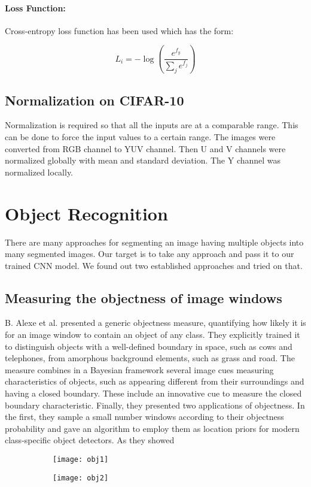  
 \paragraph{Loss Function:}
 Cross-entropy loss function has been used which has the form:
 
 
$$ L_{i} = -\log{(\frac{e^{f_y}}{\sum_j{e^{f_j}}})}$$

\subsection{Normalization on CIFAR-10}

Normalization is required so that all the inputs are at a comparable range. This can be done to force the input values to a certain range. The images were converted from RGB channel to YUV channel. Then U and V channels were normalized globally with mean and standard deviation. The Y channel was normalized locally.

\section{Object Recognition}
There are many approaches for segmenting an image having multiple objects into many segmented images. Our target is to take any approach and pass it to our trained CNN model. We found out two established approaches and tried on that.

\subsection{Measuring the objectness of image windows}
B. Alexe et al. \cite{15} presented a generic objectness measure, quantifying how likely it is for an image window to contain an object of any
class. They explicitly trained it to distinguish objects with a well-defined boundary in space, such as cows and telephones, from amorphous
background elements, such as grass and road. The measure combines in a Bayesian framework several image cues measuring
characteristics of objects, such as appearing different from their surroundings and having a closed boundary. These include an
innovative cue to measure the closed boundary characteristic. Finally, they presented two applications of objectness. In the first, they sample a small number windows according to their
objectness probability and gave an algorithm to employ them as location priors for modern class-specific object detectors. As they showed

\begin{figure}[ht] 
  \begin{subfigure}[b]{0.5\linewidth}
    \centering
    \texttt{[image: obj1]}
    \caption{} 
    \label{obj1} 
    \vspace{4ex}
  \end{subfigure}%
  \begin{subfigure}[b]{0.5\linewidth}
    \centering
    \texttt{[image: obj2]}
    \caption{} 
    \label{obj2} 
    \vspace{4ex}
  \end{subfigure}%
  \caption{}
  \label{objectnessfig} 
\end{figure}

